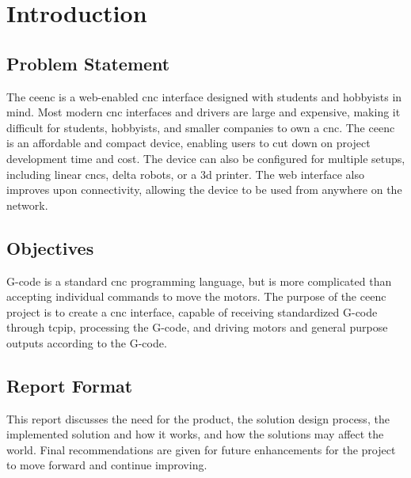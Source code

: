 \chapter{Introduction}

\section{Problem Statement}
The \gls{ceenc} is a web-enabled \gls{cnc} interface designed with students and hobbyists in mind.
Most modern \gls{cnc} interfaces and drivers are large and expensive, making it difficult for students, hobbyists, and smaller companies to own a \gls{cnc}.
The \gls{ceenc} is an affordable and compact device, enabling users to cut down on project development time and cost.
The device can also be configured for multiple setups, including linear \gls{cnc}s, delta robots, or a \gls{3d} printer.
The web interface also improves upon connectivity, allowing the device to be used from anywhere on the network.

\section{Objectives}
G-code is a standard \gls{cnc} programming language, but is more complicated than accepting individual commands to move the motors.
The purpose of the \gls{ceenc} project is to create a \gls{cnc} interface, capable of receiving standardized G-code through \gls{tcpip}, processing the G-code, and driving motors and general purpose outputs according to the G-code. 

\section{Report Format}
This report discusses the need for the product, the solution design process, the implemented solution and how it works, and how the solutions may affect the world.
Final recommendations are given for future enhancements for the project to move forward and continue improving.
